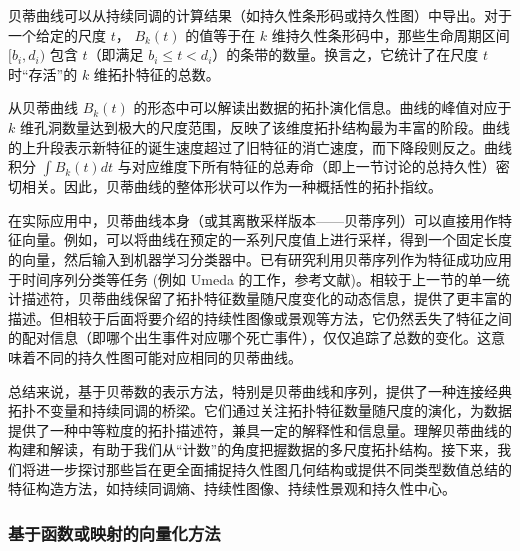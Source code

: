             贝蒂曲线可以从持续同调的计算结果（如持久性条形码或持久性图）中导出。对于一个给定的尺度 $t$， $B_k(t)$ 的值等于在 $k$ 维持久性条形码中，那些生命周期区间 $[b_i, d_i)$ 包含 $t$（即满足 $b_i \le t < d_i$）的条带的数量。换言之，它统计了在尺度 $t$ 时“存活”的 $k$ 维拓扑特征的总数。
            
            从贝蒂曲线 $B_k(t)$ 的形态中可以解读出数据的拓扑演化信息。曲线的峰值对应于 $k$ 维孔洞数量达到极大的尺度范围，反映了该维度拓扑结构最为丰富的阶段。曲线的上升段表示新特征的诞生速度超过了旧特征的消亡速度，而下降段则反之。曲线积分 $\int B_k(t) dt$ 与对应维度下所有特征的总寿命（即上一节讨论的总持久性）密切相关。因此，贝蒂曲线的整体形状可以作为一种概括性的拓扑指纹。
            
            在实际应用中，贝蒂曲线本身（或其离散采样版本——贝蒂序列）可以直接用作特征向量。例如，可以将曲线在预定的一系列尺度值上进行采样，得到一个固定长度的向量，然后输入到机器学习分类器中。已有研究利用贝蒂序列作为特征成功应用于时间序列分类等任务 (例如 Umeda 的工作，参考文献)。相较于上一节的单一统计描述符，贝蒂曲线保留了拓扑特征数量随尺度变化的动态信息，提供了更丰富的描述。但相较于后面将要介绍的持续性图像或景观等方法，它仍然丢失了特征之间的配对信息（即哪个出生事件对应哪个死亡事件），仅仅追踪了总数的变化。这意味着不同的持久性图可能对应相同的贝蒂曲线。
            
            总结来说，基于贝蒂数的表示方法，特别是贝蒂曲线和序列，提供了一种连接经典拓扑不变量和持续同调的桥梁。它们通过关注拓扑特征数量随尺度的演化，为数据提供了一种中等粒度的拓扑描述符，兼具一定的解释性和信息量。理解贝蒂曲线的构建和解读，有助于我们从“计数”的角度把握数据的多尺度拓扑结构。接下来，我们将进一步探讨那些旨在更全面捕捉持久性图几何结构或提供不同类型数值总结的特征构造方法，如持续同调熵、持续性图像、持续性景观和持久性中心。
            
        \subsubsection{基于函数或映射的向量化方法}
            \label{sec:pd_vectorization_mapping}


